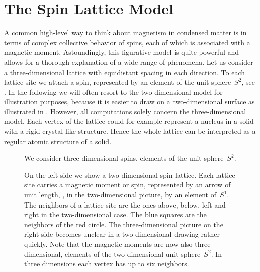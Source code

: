 \section{The Spin Lattice Model}\label{sec:model}
%
A common high-level way to think about magnetism in condensed matter is in terms
of complex collective behavior of spins, each of which is associated with a
magnetic moment. Astoundingly, this figurative model is quite powerful and
allows for a thorough explanation of a wide range of phenomena. Let us consider
a three-dimensional lattice with equidistant spacing in each direction. To each
lattice site we attach a spin, represented by an element of the unit
sphere~$S^2$, see . In the following we will often resort to the
two-dimensional model for illustration purposes, because it is easier to draw on
a two-dimensional surface as illustrated in . However, all
computations solely concern the three-dimensional model. Each vertex of the
lattice could for example represent a nucleus in a solid with a rigid crystal
like structure. Hence the whole lattice can be interpreted as a regular atomic
structure of a solid.

\begin{figure}
  \centering
  \caption{We consider three-dimensional spins, \ie{} elements of the unit
  sphere~$S^2$.}
\label{fig:s2}
\end{figure}

\begin{figure}
  \centering
  \caption{On the left side we show a two-dimensional spin lattice. Each lattice
  site carries a magnetic moment or spin, represented by an arrow of unit
  length, \ie{}, in the two-dimensional picture, by an element of~$S^1$. The
  neighbors of a lattice site are the ones above, below, left and right in the
  two-dimensional case. The blue squares are the neighbors of the red circle.
  The three-dimensional picture on the right side becomes unclear in a
  two-dimensional drawing rather quickly. Note that the magnetic moments are now
  also three-dimensional, \ie{} elements of the two-dimensional unit
  sphere~$S^2$. In three dimensions each vertex has up to six neighbors.}
\label{fig:lattice}
\end{figure}

